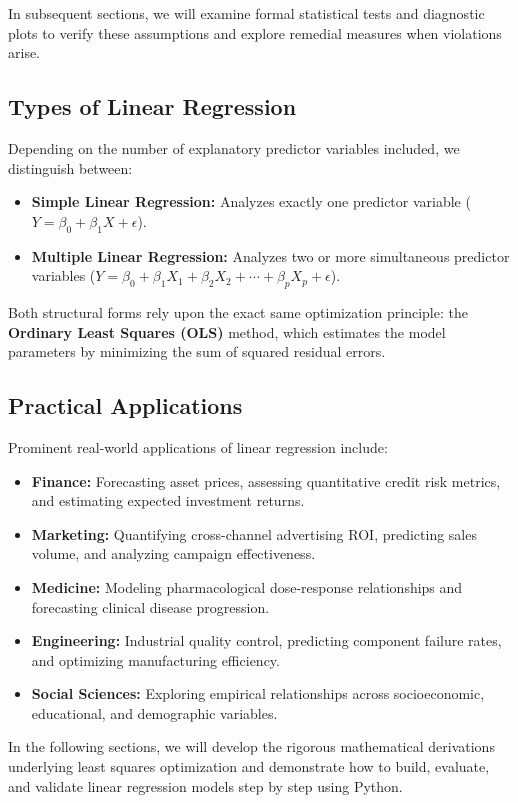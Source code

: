 In subsequent sections, we will examine formal statistical tests and diagnostic plots to verify these assumptions and explore remedial measures when violations arise.

\subsection{Types of Linear Regression}

Depending on the number of explanatory predictor variables included, we distinguish between:

\begin{itemize}
	\item \textbf{Simple Linear Regression:} Analyzes exactly one predictor variable ($Y = \beta_0 + \beta_1 X + \epsilon$).
	\item \textbf{Multiple Linear Regression:} Analyzes two or more simultaneous predictor variables ($Y = \beta_0 + \beta_1 X_1 + \beta_2 X_2 + \cdots + \beta_p X_p + \epsilon$).
\end{itemize}

Both structural forms rely upon the exact same optimization principle: the \textbf{Ordinary Least Squares (OLS)} method, which estimates the model parameters by minimizing the sum of squared residual errors.

\subsection{Practical Applications}

Prominent real-world applications of linear regression include:

\begin{itemize}
	\item \textbf{Finance:} Forecasting asset prices, assessing quantitative credit risk metrics, and estimating expected investment returns.
	\item \textbf{Marketing:} Quantifying cross-channel advertising ROI, predicting sales volume, and analyzing campaign effectiveness.
	\item \textbf{Medicine:} Modeling pharmacological dose-response relationships and forecasting clinical disease progression.
	\item \textbf{Engineering:} Industrial quality control, predicting component failure rates, and optimizing manufacturing efficiency.
	\item \textbf{Social Sciences:} Exploring empirical relationships across socioeconomic, educational, and demographic variables.
\end{itemize}

In the following sections, we will develop the rigorous mathematical derivations underlying least squares optimization and demonstrate how to build, evaluate, and validate linear regression models step by step using Python.
